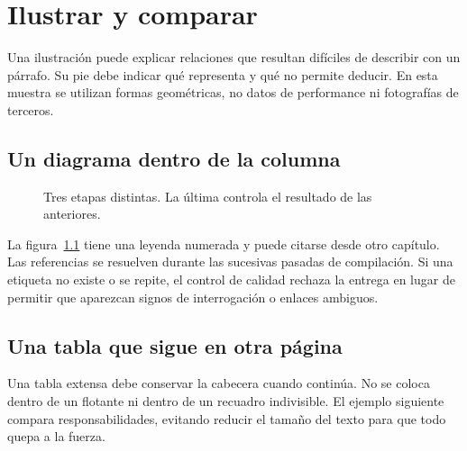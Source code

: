 \chapter{Ilustrar y comparar}
Una ilustración puede explicar relaciones que resultan difíciles de describir con un párrafo. Su pie debe indicar qué representa y qué no permite deducir. En esta muestra se utilizan formas geométricas, no datos de performance ni fotografías de terceros.

\section{Un diagrama dentro de la columna}
\begin{figure}[htbp]
\centering
{}
\caption{Tres etapas distintas. La última controla el resultado de las anteriores.}
\label{fig:flujo}
\end{figure}

La figura~\ref{fig:flujo} tiene una leyenda numerada y puede citarse desde otro capítulo. Las referencias se resuelven durante las sucesivas pasadas de compilación. Si una etiqueta no existe o se repite, el control de calidad rechaza la entrega en lugar de permitir que aparezcan signos de interrogación o enlaces ambiguos.

\section{Una tabla que sigue en otra página}
Una tabla extensa debe conservar la cabecera cuando continúa. No se coloca dentro de un flotante ni dentro de un recuadro indivisible. El ejemplo siguiente compara responsabilidades, evitando reducir el tamaño del texto para que todo quepa a la fuerza.

